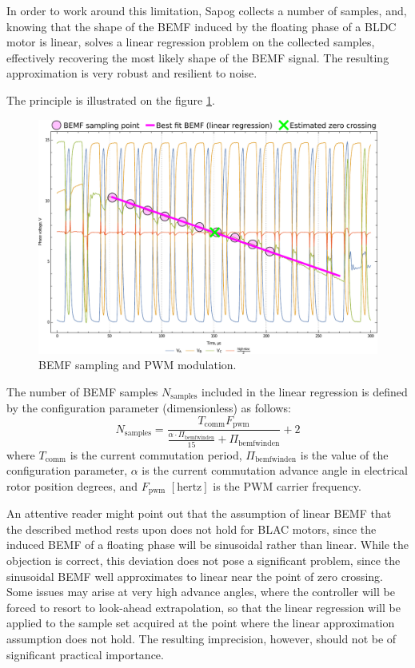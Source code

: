 \documentclass{zubaxdoc}
\begin{document}
In order to work around this limitation, Sapog collects a number of samples, and,
knowing that the shape of the BEMF induced by the floating phase of a BLDC motor is linear,
solves a linear regression problem on the collected samples, effectively recovering the most likely
shape of the BEMF signal.
The resulting approximation is very robust and resilient to noise.

The principle is illustrated on the figure \ref{phase_voltage_sampling}.

\begin{figure}[hbtp]
    \centering
	\includegraphics[width=\textwidth]{phase_voltage_sampling}
	\caption{BEMF sampling and PWM modulation.
	\label{phase_voltage_sampling}}
\end{figure}

The number of BEMF samples $N_\text{samples}$ included in the linear regression is defined by
the configuration parameter  (dimensionless) as follows:
\begin{equation}
N_\text{samples} =
\frac{T_{\text{comm}} F_{\text{pwm}}}{\frac{\alpha\cdot{}\Pi_\text{bemfwinden}}{15} + \Pi_\text{bemfwinden}} + 2
\end{equation}
where $T_{\text{comm}}$ is the current commutation period,
$\Pi_\text{bemfwinden}$ is the value of the configuration parameter,
$\alpha$ is the current commutation advance angle in electrical rotor position degrees,
and $F_{\text{pwm}}$ $\left[\text{hertz}\right]$ is the PWM carrier frequency.

An attentive reader might point out that the assumption of linear BEMF that the described method rests
upon does not hold for BLAC motors, since the induced BEMF of a floating phase will be sinusoidal rather
than linear.
While the objection is correct, this deviation does not pose a significant problem, since the sinusoidal
BEMF well approximates to linear near the point of zero crossing.
Some issues may arise at very high advance angles, where the controller will be forced to resort to
look-ahead extrapolation, so that the linear regression will be applied to the sample set acquired
at the point where the linear approximation assumption does not hold.
The resulting imprecision, however, should not be of significant practical importance.
\end{document}
